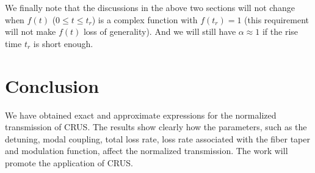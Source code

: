 \documentclass[aps,onecolumn,superscriptaddress,showpacs]{revtex4}
\begin{document}
We finally note that the discussions in the above two sections will not change when
$f(t)$ ($0\leq t \leq t_r$) is a complex function with $f(t_r)=1$ (this requirement will not make $f(t)$ loss of generality).
And we will still have $\alpha \approx 1$ if the rise time $t_r$ is short enough.

\section{Conclusion}
We have obtained exact and approximate expressions for the normalized transmission of CRUS.
The results show clearly how the parameters, such as the detuning, modal coupling, total loss rate, loss rate associated with the fiber taper and
modulation function, affect the normalized transmission.
The work will promote the application of CRUS.
\end{document}
